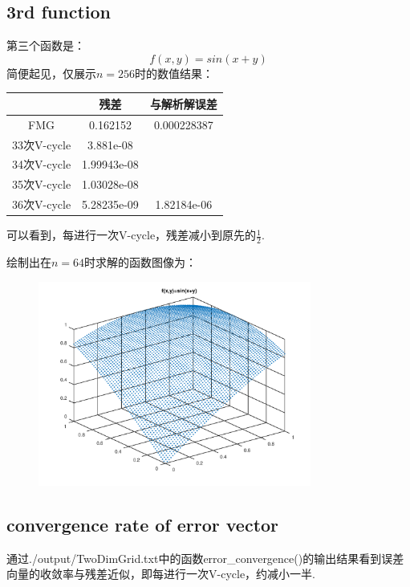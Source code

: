 \documentclass[a4paper,11.5pt,UTF8]{ctexart}
\begin{document}
\begin{large}
\subsection{3rd function}
\par 第三个函数是：$$f(x,y)=sin(x+y)$$
简便起见，仅展示$n=256$时的数值结果：
\begin{center}
	\begin{tabular}{|c|c|c|}
		\hline
		& 残差 & 与解析解误差  \\
		\hline
		FMG & 0.162152 & 0.000228387  \\
		\hline
		33次V-cycle & 3.881e-08 & ~  \\
		\hline
		34次V-cycle & 1.99943e-08 & ~  \\
		\hline
		35次V-cycle & 1.03028e-08 & ~  \\
		\hline
		36次V-cycle & 5.28235e-09 & 1.82184e-06  \\
		\hline
	\end{tabular}
\end{center}
可以看到，每进行一次V-cycle，残差减小到原先的$\frac{1}{2}$.
\par 绘制出在$n=64$时求解的函数图像为：
\begin{figure}[H]
	\centering
	\includegraphics[width=0.8\textwidth,height=0.6\textwidth]{../output/figure/dim2_3.png}
\end{figure}

\subsection{convergence rate of error vector}
\par 通过./output/TwoDimGrid.txt中的函数error\_convergence()的输出结果看到误差向量的收敛率与残差近似，即每进行一次V-cycle，约减小一半.


\end{large}
\end{document}
